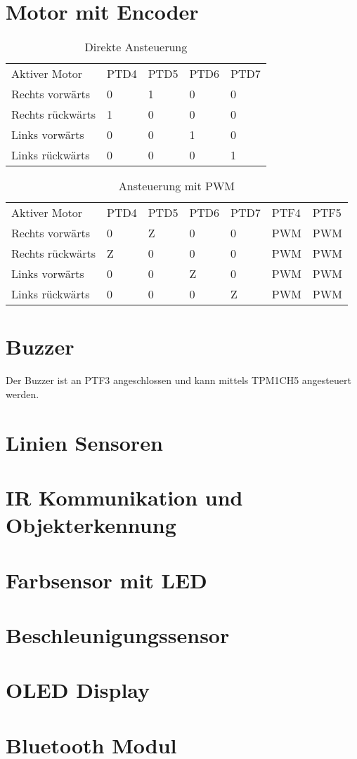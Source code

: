 \documentclass[a4paper,10pt,fleqn]{article}
\begin{document}
\section{Motor mit Encoder}
\begin{table}[h!]
\begin{tabular}{lllll}
\rowcolor{white} Aktiver Motor      & PTD4  & PTD5  & PTD6  & PTD7  \\
\rowcolor{lgray} Rechts vorwärts    & 0     & 1     & 0     & 0     \\
\rowcolor{white} Rechts rückwärts   & 1     & 0     & 0     & 0     \\
\rowcolor{lgray} Links vorwärts     & 0     & 0     & 1     & 0     \\
\rowcolor{white} Links rückwärts    & 0     & 0     & 0     & 1     \\
\end{tabular}
\caption{Direkte Ansteuerung}
\end{table}
\begin{table}[h!]
\begin{tabular}{lllllll}
\rowcolor{white} Aktiver Motor      & PTD4  & PTD5  & PTD6  & PTD7  & PTF4  & PTF5  \\
\rowcolor{lgray} Rechts vorwärts    & 0     & Z     & 0     & 0     & PWM   & PWM   \\
\rowcolor{white} Rechts rückwärts   & Z     & 0     & 0     & 0     & PWM   & PWM   \\
\rowcolor{lgray} Links vorwärts     & 0     & 0     & Z     & 0     & PWM   & PWM   \\
\rowcolor{white} Links rückwärts    & 0     & 0     & 0     & Z     & PWM   & PWM   \\
\end{tabular}
\caption{Ansteuerung mit PWM}
\end{table}

\section{Buzzer}
Der Buzzer ist an PTF3 angeschlossen und kann mittels TPM1CH5 angesteuert 
werden. 

\section{Linien Sensoren}

\section{IR Kommunikation und Objekterkennung}

\section{Farbsensor mit LED}

\section{Beschleunigungssensor}

\section{OLED Display}

\section{Bluetooth Modul}
\end{document}
